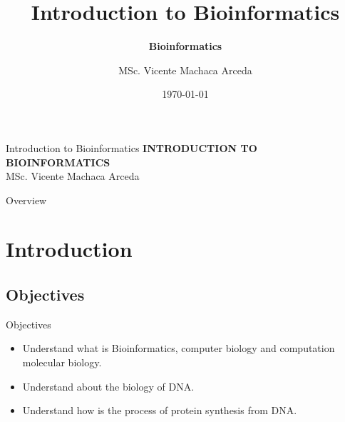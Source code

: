 \documentclass[10pt]{beamer}
\title[] %
{ %
      \textbf{Introduction to Bioinformatics}
}
\subtitle[Introduction  to Bioinformatics]
{
      \textbf{Bioinformatics}
}
\author[MSc. Vicente Machaca Arceda]
{      MSc. Vicente Machaca Arceda \\
      {}
}
\institute[]
{
      Universidad Nacional de san Agustín de Arequipa
  
}
\date{\today}
\begin{document}



{\1%


\begin{frame}{Introduction  to Bioinformatics}{}
\centering
\textbf{INTRODUCTION TO BIOINFORMATICS} \\
MSc. Vicente Machaca Arceda 
\end{frame}

\begin{frame}{Overview}
\tableofcontents
\end{frame}


\section{Introduction}

\subsection{Objectives}

\begin{frame}{Objectives}{}
\begin{itemize}
    \item<1-> Understand what is Bioinformatics, computer biology and computation molecular biology. 
    \item<2-> Understand about the biology of DNA.
    \item<3-> Understand how is the process of protein synthesis from DNA.
  \end{itemize}
\end{frame}

}
\end{document}
